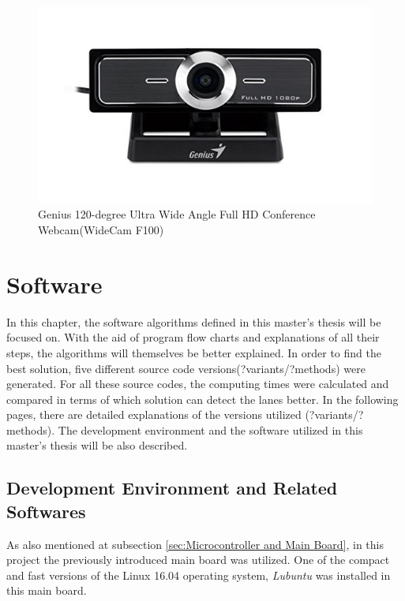 \begin{figure}[H]
	\centering
	\hspace*{0cm}   
	\includegraphics[width=150mm,scale=1]{./Bilder/Genius_F100_camera.png}
	\caption{Genius 120-degree Ultra Wide Angle Full HD Conference Webcam(WideCam F100) }
\end{figure}


%
\section{Software}\label{sec:Software}


In this chapter, the software algorithms defined in this master's thesis will be focused on. With the aid of program flow charts and explanations of all their steps, the algorithms will themselves be better explained. In order to find the best solution, five different source code versions(?variants/?methods) were generated. For all these source codes, the computing times were calculated and compared in terms of which solution can detect the lanes better. In the following pages, there are detailed explanations of the versions utilized (?variants/?methods). The development environment and the software utilized in this master's thesis will be also described.

%
\subsection{Development Environment and Related Softwares}
\label{sec:Development Environment and Related Softwares}

As also mentioned at subsection \ref{sec:Microcontroller and Main Board}, in this project the previously introduced main board was utilized. One of the compact and fast versions of the Linux 16.04 operating system, \textit{Lubuntu} was installed in this main board.

